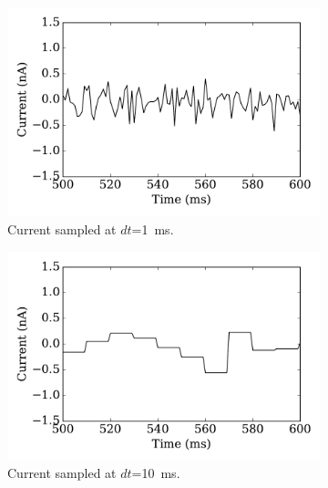 	\begin{figure}[tbp!]
		\centering
		  \par
		\begin{subfigure}[t]{0.43\textwidth}
			\includegraphics[width=\textwidth]{pics_iconip/curr_dt1.pdf}
			\caption{Current sampled at $dt$=1~ms.}
		\end{subfigure}
		\begin{subfigure}[t]{0.43\textwidth}
			\includegraphics[width=\textwidth]{pics_iconip/curr_dt10.pdf}
			\caption{Current sampled at $dt$=10~ms.}
		\end{subfigure}\\
		\begin{subfigure}[t]{0.43\textwidth}

\end{subfigure}
\end{figure}
